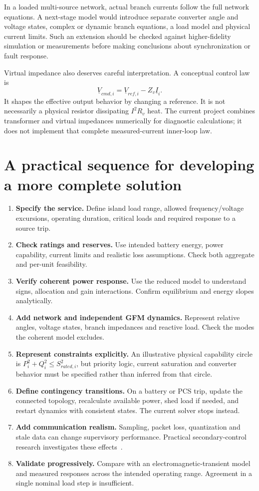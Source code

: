 \documentclass[11pt,a4paper]{article}
\begin{document}
In a loaded multi-source network, actual branch currents follow the full network equations. A next-stage model would introduce separate converter angle and voltage states, complex or dynamic branch equations, a load model and physical current limits. Such an extension should be checked against higher-fidelity simulation or measurements before making conclusions about synchronization or fault response.

Virtual impedance also deserves careful interpretation. A conceptual control law is
\begin{equation}
\underline V_{cmd,i}=\underline V_{ref,i}-Z_v\underline I_i.
\end{equation}
It shapes the effective output behavior by changing a reference. It is not necessarily a physical resistor dissipating $I^2R_v$ heat. The current project combines transformer and virtual impedances numerically for diagnostic calculations; it does not implement that complete measured-current inner-loop law.

\section{A practical sequence for developing a more complete solution}
\begin{enumerate}
\item \textbf{Specify the service.} Define island load range, allowed frequency/voltage excursions, operating duration, critical loads and required response to a source trip.
\item \textbf{Check ratings and reserves.} Use intended battery energy, power capability, current limits and realistic loss assumptions. Check both aggregate and per-unit feasibility.
\item \textbf{Verify coherent power response.} Use the reduced model to understand signs, allocation and gain interactions. Confirm equilibrium and energy slopes analytically.
\item \textbf{Add network and independent GFM dynamics.} Represent relative angles, voltage states, branch impedances and reactive load. Check the modes the coherent model excludes.
\item \textbf{Represent constraints explicitly.} An illustrative physical capability circle is $P_i^2+Q_i^2\le S_{rated,i}^2$, but priority logic, current saturation and converter behavior must be specified rather than inferred from that circle.
\item \textbf{Define contingency transitions.} On a battery or PCS trip, update the connected topology, recalculate available power, shed load if needed, and restart dynamics with consistent states. The current solver stops instead.
\item \textbf{Add communication realism.} Sampling, packet loss, quantization and stale data can change supervisory performance. Practical secondary-control research investigates these effects~\cite{secondaryhardware}.
\item \textbf{Validate progressively.} Compare with an electromagnetic-transient model and measured responses across the intended operating range. Agreement in a single nominal load step is insufficient.
\end{enumerate}
\end{document}
